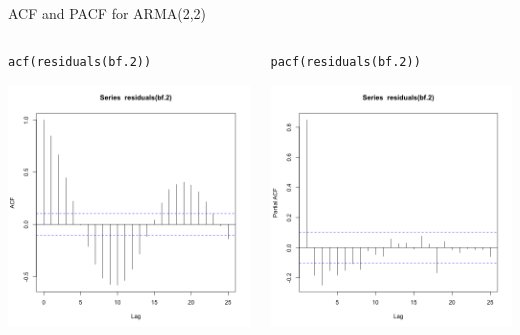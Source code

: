 \documentclass{beamer}
\begin{document}
\begin{frame}[fragile]{ACF and PACF for ARMA(2,2)}
  \begin{columns}
      \begin{column}{0.5\textwidth}
      \begin{verbatim}
acf(residuals(bf.2))
      \end{verbatim}
      \includegraphics[width=\textwidth]{lectures/day_4_GLS/figures/unnamed-chunk-28-1.png}
      \end{column}
      \begin{column}{0.5\textwidth}
      \begin{verbatim}
pacf(residuals(bf.2))
      \end{verbatim}
      \includegraphics[width=\textwidth]{lectures/day_4_GLS/figures/unnamed-chunk-29-1.png}

\end{column}
\end{columns}
\end{frame}
\end{document}

